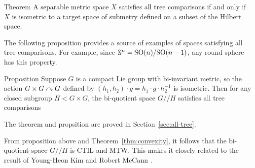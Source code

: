 \begin{thm}{Theorem}\label{thm:hilbert-quotient}
A separable metric space $X$ satisfies all tree comparisons if and only if
$X$ is isometric to a target space of submetry defined on a subset  of the Hilbert space.
\end{thm} %

The following proposition provides a source of examples of spaces satisfying all tree comparisons.
For example, since $\mathbb{S}^n=\mathrm{SO}(n)/\mathrm{SO}(n-1)$, any round sphere has this property.


\begin{thm}{Proposition}\label{prop:group}
Suppose $G$ is a compact Lie group with bi-invariant metric, so the action $G\times G\curvearrowright G$ defined by $(h_1,h_2)\cdot g=h_1\cdot g\cdot  h_2^{-1}$ is isometric. 
Then for any closed subgroup $H<G\times G$, the bi-quotient space $G/\!\!/H$ satisfies all tree comparisons
\end{thm}

The theorem and propsition are proved in Section~\ref{sec:all-tree}.

From proposition above and Theorem~\ref{thm:convexity}, it follows that the bi-quotient space $G/\!\!/H$ is CTIL and MTW.
This makes it closely related to the result of Young-Heon Kim and Robert McCann \cite{kim-mccann}.

